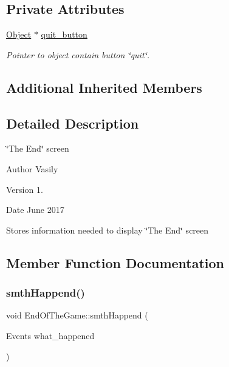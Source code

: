 \subsection*{Private Attributes}
\begin{DoxyCompactItemize}
\item 
\mbox{\label{class_end_of_the_game_af4d60352787faf883df1eec46183eee9}} 
\hyperlink{class_object}{Object} $\ast$ \hyperlink{class_end_of_the_game_af4d60352787faf883df1eec46183eee9}{quit\+\_\+button}
\begin{DoxyCompactList}\small\item\em Pointer to object contain button \char`\"{}quit\char`\"{}. \end{DoxyCompactList}\end{DoxyCompactItemize}
\subsection*{Additional Inherited Members}


\subsection{Detailed Description}
\char`\"{}\+The End\char`\"{} screen 

\begin{DoxyAuthor}{Author}
Vasily 
\end{DoxyAuthor}
\begin{DoxyVersion}{Version}
1. 
\end{DoxyVersion}
\begin{DoxyDate}{Date}
June 2017
\end{DoxyDate}
Stores information needed to display \char`\"{}\+The End\char`\"{} screen 

\subsection{Member Function Documentation}
\mbox{\label{class_end_of_the_game_a88ac00a6aaa5193c7642d9ea2c6be688}} 
\subsubsection{\texorpdfstring{smth\+Happend()}{smthHappend()}}
{\footnotesize\ttfamily void End\+Of\+The\+Game\+::smth\+Happend (\begin{DoxyParamCaption}\item[{Events}]{what\+\_\+happened }\end{DoxyParamCaption})\hspace{0.3cm}{\ttfamily [virtual]}}



